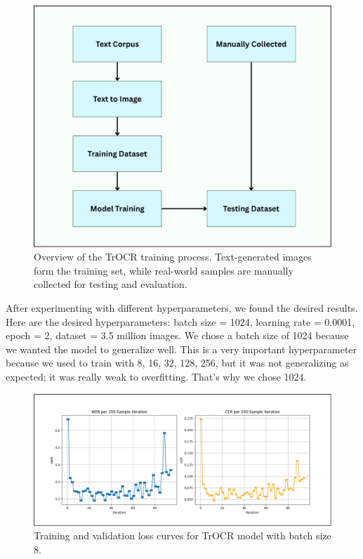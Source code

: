 \begin{figure}[H]
    \centering
    \includegraphics[width=\textwidth]{figures/trocr_model_overflow_training.png}
    \caption{Overview of the TrOCR training process. Text-generated 
    images form the training set, while real-world samples are 
    manually collected for testing and evaluation.}
    \label{fig:trocr-training-pipeline}
\end{figure}

After experimenting with different hyperparameters, we found the desired results. Here are the 
desired hyperparameters: batch size = 1024, learning rate = 0.0001, epoch = 2, dataset = 3.5 
million images. We chose a batch size of 1024 because we wanted the model to generalize well. 
This is a very important hyperparameter because we used to train with 8, 16, 32, 128, 256, 
but it was not generalizing as expected; it was really weak to overfitting. That's why we 
chose 1024.



\begin{figure}[H]
    \centering
    \includegraphics[width=\textwidth]{figures/trocr_overfitting_v1.png}
    \caption{Training and validation loss curves for TrOCR model with batch size 8.}
    \label{fig:trocr-overfitting}
\end{figure}

